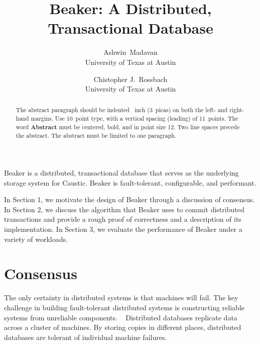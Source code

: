 \documentclass{article}
\begin{document}
  \date{}

  \title{\Large \bf Beaker: A Distributed, Transactional Database}

  \author{
    {\rm Ashwin\ Madavan} \\
    University of Texas at Austin \\
    \and
    {\rm Chistopher J.\ Rossbach} \\
    University of Texas at Austin \\
  }

  \maketitle

  \begin{abstract}
  The abstract paragraph should be indented ~inch
  (3~picas) on both the left- and right-hand margins. Use 10~point
  type, with a vertical spacing (leading) of 11~points.  The word
  \textbf{Abstract} must be centered, bold, and in point size 12. Two
  line spaces precede the abstract. The abstract must be limited to
  one paragraph.
  \end{abstract}

  Beaker is a distributed, transactional database that serves as the underlying storage system for
  Caustic. Beaker is fault-tolerant, configurable, and performant.

  In Section 1, we motivate the design of Beaker through a discussion of consensus. In Section
  2, we discuss the algorithm that Beaker uses to commit distributed transactions and provide a rough
  proof of correctness and a description of its implementation. In Section 3, we evaluate the
  performance of Beaker under a variety of workloads.

  \section{Consensus}
  The only certainty in distributed systems is that machines will fail. The key challenge in building
  fault-tolerant distributed systems is constructing reliable systems from unreliable components.
  ~\cite{reliability} Distributed databases replicate data across a cluster of machines. By storing
  copies in different places, distributed databases are tolerant of individual machine failures.
\end{document}
